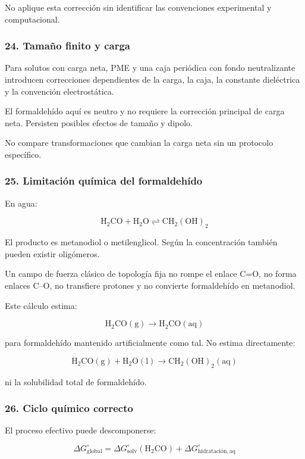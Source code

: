 \documentclass[
  spanish,
  11pt,
  a4paper]{article}
\begin{document}
No aplique esta corrección sin identificar las convenciones experimental
y computacional.

\subsubsection{24. Tamaño finito y
carga}\label{tamauxf1o-finito-y-carga}

Para solutos con carga neta, PME y una caja periódica con fondo
neutralizante introducen correcciones dependientes de la carga, la caja,
la constante dieléctrica y la convención electrostática.

El formaldehído aquí es neutro y no requiere la corrección principal de
carga neta. Persisten posibles efectos de tamaño y dipolo.

No compare transformaciones que cambian la carga neta sin un protocolo
específico.

\subsubsection{25. Limitación química del
formaldehído}\label{limitaciuxf3n-quuxedmica-del-formaldehuxeddo}

En agua:

\[
\mathrm{H_2CO + H_2O
\rightleftharpoons
CH_2(OH)_2}
\]

El producto es metanodiol o metilenglicol. Según la concentración
también pueden existir oligómeros.

Un campo de fuerza clásico de topología fija no rompe el enlace C=O, no
forma enlaces C--O, no transfiere protones y no convierte formaldehído
en metanodiol.

Este cálculo estima:

\[
\mathrm{H_2CO(g)}
\rightarrow
\mathrm{H_2CO(aq)}
\]

para formaldehído mantenido artificialmente como tal. No estima
directamente:

\[
\mathrm{H_2CO(g)+H_2O(l)}
\rightarrow
\mathrm{CH_2(OH)_2(aq)}
\]

ni la solubilidad total de formaldehído.

\subsubsection{26. Ciclo químico
correcto}\label{ciclo-quuxedmico-correcto}

El proceso efectivo puede descomponerse:

\[
\Delta G^\circ_{\mathrm{global}}
=
\Delta G^\circ_{\mathrm{solv}}(\mathrm{H_2CO})
+
\Delta G^\circ_{\mathrm{hidratación,aq}}
\]
\end{document}
